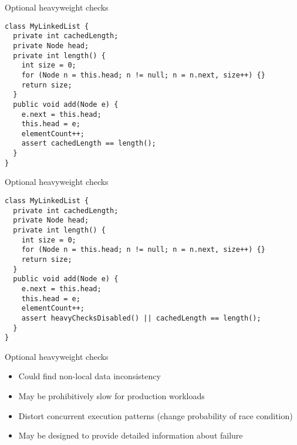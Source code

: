 \begin{frame}[fragile]{Optional heavyweight checks}

\begin{verbatim}
class MyLinkedList {
  private int cachedLength;
  private Node head;
  private int length() {
    int size = 0;
    for (Node n = this.head; n != null; n = n.next, size++) {}
    return size;
  }
  public void add(Node e) {
    e.next = this.head;
    this.head = e;
    elementCount++;
    assert cachedLength == length();
  }
}
\end{verbatim}

\end{frame}

\begin{frame}{Optional heavyweight checks}

\begin{verbatim}
class MyLinkedList {
  private int cachedLength;
  private Node head;
  private int length() {
    int size = 0;
    for (Node n = this.head; n != null; n = n.next, size++) {}
    return size;
  }
  public void add(Node e) {
    e.next = this.head;
    this.head = e;
    elementCount++;
    assert heavyChecksDisabled() || cachedLength == length();
  }
}
\end{verbatim}
\end{frame}


\begin{frame}{Optional heavyweight checks}

\begin{itemize}
  \item Could find non-local data inconsistency
  \item May be prohibitively slow for production workloads
  \item Distort concurrent execution patterns (change probability of race condition)
  \item May be designed to provide detailed information about failure
\end{itemize}
\end{frame}


